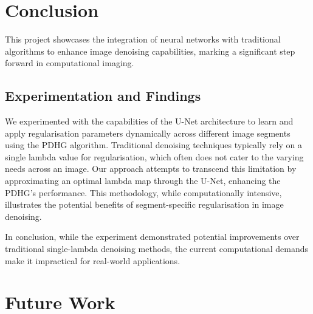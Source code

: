 \documentclass[12pt]{article}
\begin{document}


\section{Conclusion}



This project showcases the integration of neural networks with traditional algorithms to enhance image denoising capabilities, marking a significant step forward in computational imaging.

\subsection{Experimentation and Findings}

We experimented with the capabilities of the U-Net architecture to learn and apply regularisation parameters dynamically across different image segments using the PDHG algorithm. Traditional denoising techniques typically rely on a single lambda value for regularisation, which often does not cater to the varying needs across an image. Our approach attempts to transcend this limitation by approximating an optimal lambda map through the U-Net, enhancing the PDHG's performance. This methodology, while computationally intensive, illustrates the potential benefits of segment-specific regularisation in image denoising.



In conclusion, while the experiment demonstrated potential improvements over traditional single-lambda denoising methods, the current computational demands make it impractical for real-world applications. 

\section{Future Work}
\end{document}
